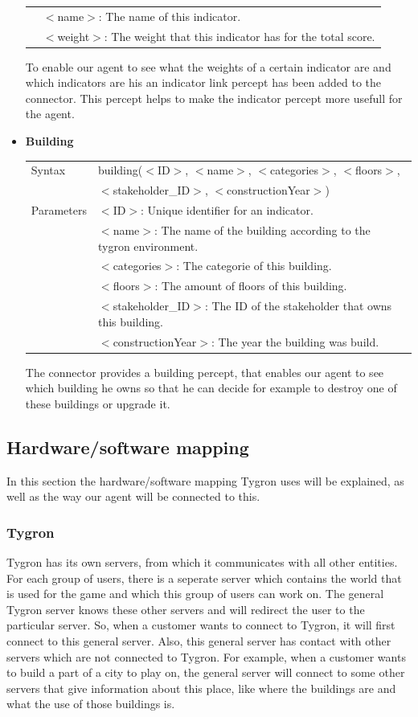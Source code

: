 \begin{itemize}
\begin{tabular}{ l l }
				\\& $<$name$>$: The name of this indicator. 
				\\& $<$weight$>$: The weight that this indicator has for the total score. 
	\end{tabular}
	To enable our agent to see what the weights of a certain indicator are and which indicators are his an indicator link percept has been added to the connector. This percept helps to make the indicator percept more usefull for the agent.
	\item \textbf{Building} \\ 
	\begin{tabular}{ l l }
 		 Syntax & building($<$ID$>$, $<$name$>$, $<$categories$>$, $<$floors$>$, \\
		& $<$stakeholder\_ID$>$, $<$constructionYear$>$) \\
  		Parameters &  $<$ID$>$: Unique identifier for an indicator. 
				\\& $<$name$>$: The name of the building according to the tygron environment.
				\\& $<$categories$>$: The categorie of this building.
				\\& $<$floors$>$: The amount of floors of this building.
				\\& $<$stakeholder\_ID$>$: The ID of the stakeholder that owns this building.
				\\& $<$constructionYear$>$: The year the building was build.
	\end{tabular}
	The connector provides a building percept, that enables our agent to see which building he owns so that he can decide for example to destroy one of these buildings or upgrade it.

\end{itemize}

\newpage
\subsection{Hardware/software mapping}
In this section the hardware/software mapping Tygron uses will be explained, as well as the way our agent will be connected to this.

\subsubsection{Tygron}
Tygron has its own servers, from which it communicates with all other entities. For each group of users, there is a seperate server which contains the world that is used for the game and which this group of users can work on. The general Tygron server knows these other servers and will redirect the user to the particular server. So, when a customer wants to connect to Tygron, it will first connect to this general server. Also, this general server has contact with other servers which are not connected to Tygron. For example, when a customer wants to build a part of a city to play on, the general server will connect to some other servers that give information about this place, like where the buildings are and what the use of those buildings is. 

